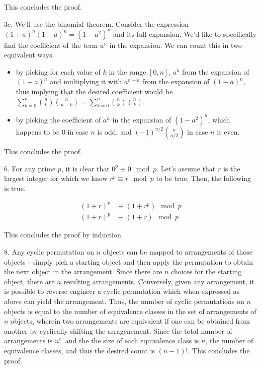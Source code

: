 \documentclass{article}
\begin{document}
This concludes the proof.

3e. We'll use the binomial theorem. Consider the expression $(1 + a)^n(1 - a)^n = (1 - a^2)^n$ and its full expansion. We'd like to specifically find the coefficient of the term $a^n$ in the expansion. We can count this in two equivalent ways.

\begin{itemize}
    \item by picking for each value of $k$ in the range $[0, n]$, $a^k$ from the expansion of $(1 + a)^n$ and multiplying it with $a^{n - k}$ from the expansion of $(1 - a)^n$, thus implying that the desired coefficient would be $\sum_{k=0}^n{n \choose k}{n \choose n - k} = \sum_{k=0}^n{n \choose k}{n \choose k}$.
    \item by picking the coefficient of $a^n$ in the expansion of $(1 - a^2)^n$, which happens to be $0$ in case $n$ is odd, and $(-1)^{n/2}{n \choose n / 2}$ in case $n$ is even.
\end{itemize}

This concludes the proof.

6. For any prime $p$, it is clear that $0^p \equiv 0 \mod{p}$. Let's assume that $r$ is the largest integer for which we know $r^p \equiv r \mod{p}$ to be true. Then, the following is true.

\begin{align*}
    (1 + r)^p &\equiv (1 + r^p) \mod{p} \\
    (1 + r)^p &\equiv (1 + r) \mod{p}
\end{align*}

This concludes the proof by induction.

8. Any cyclic permutation on $n$ objects can be mapped to arrangements of those objects - simply pick a starting object and then apply the permutation to obtain the next object in the arrangement. Since there are $n$ choices for the starting object, there are $n$ resulting arrangements. Conversely, given any arrangement, it is possible to reverse engineer a cyclic permutation which when expressed as above can yield the arrangement. Thus, the number of cyclic permutations on $n$ objects is equal to the number of equivalence classes in the set of arrangements of $n$ objects, wherein two arrangements are equivalent if one can be obtained from another by cyclically shifting the arragenement. Since the total number of arrangements is $n!$, and the the size of each equivalence class is $n$, the number of equivalence classes, and thus the desired count is $(n - 1)!$. This concludes the proof.
\end{document}
